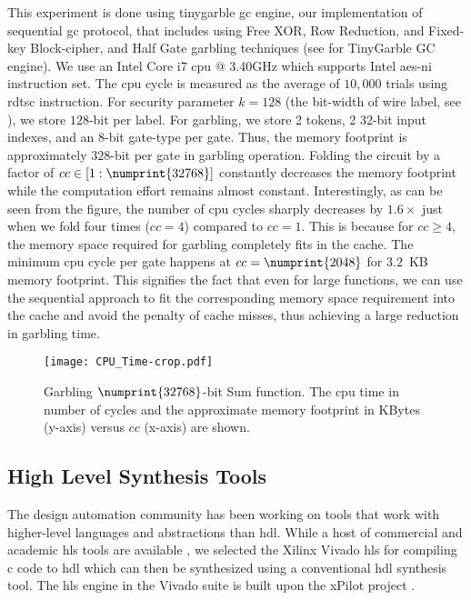 This experiment is done using \gls{tinygarble} \acrshort{gc} engine, our  implementation of sequential \acrshort{gc} protocol, that includes using Free XOR, Row Reduction, and Fixed-key Block-cipher, and Half Gate garbling techniques (see  for TinyGarble GC engine).
We use an Intel Core i7 \acrshort{cpu} @ 3.40GHz which supports Intel \acrfull{aes-ni} instruction set.
The \acrshort{cpu} cycle is measured as the average of $10,000$ trials using \gls{rdtsc} instruction.
For security parameter $k=128$ (the bit-width of wire label, see ), we store $128$-bit per label.
For garbling, we store 2 tokens, 2 32-bit input indexes, and an 8-bit gate-type per gate.
Thus, the memory footprint is approximately $328$-bit per gate in garbling operation.
Folding the circuit by a factor of $cc \in [1:\numprint{32768}]$ constantly decreases the memory footprint while the computation effort remains almost constant.
Interestingly, as can be seen from the figure, the number of \acrshort{cpu} cycles sharply decreases by $1.6\times$ just when we fold four times ($cc=4$) compared to $cc=1$.
This is because for $cc \geq 4$, the memory space required for garbling completely fits in the cache.
The minimum \acrshort{cpu} cycle per gate happens at $cc=\numprint{2048}$ for $3.2$~KB memory footprint.
This signifies the fact that even for large functions, we can use the sequential approach to fit the corresponding memory space requirement into the cache and avoid the penalty of cache misses, thus achieving a large reduction in garbling time.

\begin{figure}
	\centering
	\texttt{[image: CPU\_Time-crop.pdf]}
	\caption{Garbling $\numprint{32768}$-bit Sum function.
The \acrshort{cpu} time in number of cycles and the approximate memory footprint in KBytes (y-axis) versus $cc$ (x-axis) are shown.}
	\label{fig:cpu_time}
\end{figure}

\subsection{High Level Synthesis Tools}\label{ssec:eval-tinygarble-high}
The design automation community has been working on tools that work with higher-level languages and abstractions than \acrshort{hdl}.
While a host of commercial and academic \acrshort{hls} tools are available \cite{tool:Vivado, tool:PandA, decaluwe2004myhdl, Gupta2004}, we selected the Xilinx Vivado \acrshort{hls} for compiling \gls{c} code to \acrshort{hdl} which can then be synthesized using a conventional \acrshort{hdl} synthesis tool.
The \acrshort{hls} engine in the Vivado suite is built upon the xPilot project \cite{Chapter:Zhang2008}.

